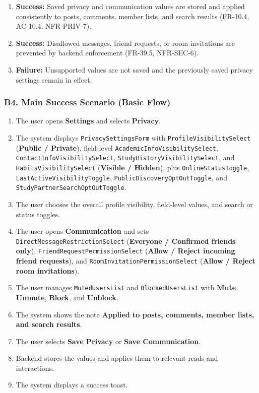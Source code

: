 \documentclass[12pt]{article}
\begin{document}
\begin{enumerate}
\item \textbf{Success:} Saved privacy and communication values are stored and applied consistently to posts, comments, member lists, and search results (FR-10.4, AC-10.4, NFR-PRIV-7).
\item \textbf{Success:} Disallowed messages, friend requests, or room invitations are prevented by backend enforcement (FR-39.5, NFR-SEC-6).
\item \textbf{Failure:} Unsupported values are not saved and the previously saved privacy settings remain in effect.
\end{enumerate}
\par\medskip

\hypertarget{sec:b4-main-success-scenario-basic-flow}{}
\subsubsection*{B4. Main Success Scenario (Basic Flow)}
\par\medskip

\begin{enumerate}
\item The user opens \textbf{Settings} and selects \textbf{Privacy}.
\item The system displays \texttt{PrivacySettingsForm} with \texttt{ProfileVisibilitySelect} (\textbf{Public / Private}), field-level \texttt{AcademicInfoVisibilitySelect}, \texttt{ContactInfoVisibilitySelect}, \texttt{StudyHistoryVisibilitySelect}, and \texttt{HabitsVisibilitySelect} (\textbf{Visible / Hidden}), plus \texttt{OnlineStatusToggle}, \texttt{LastActiveVisibilityToggle}, \texttt{PublicDiscoveryOptOutToggle}, and \texttt{StudyPartnerSearchOptOutToggle}.
\item The user chooses the overall profile visibility, field-level values, and search or status toggles.
\item The user opens \textbf{Communication} and sets \texttt{DirectMessageRestrictionSelect} (\textbf{Everyone / Confirmed friends only}), \texttt{FriendRequestPermissionSelect} (\textbf{Allow / Reject incoming friend requests}), and \texttt{RoomInvitationPermissionSelect} (\textbf{Allow / Reject room invitations}).
\item The user manages \texttt{MutedUsersList} and \texttt{BlockedUsersList} with \textbf{Mute}, \textbf{Unmute}, \textbf{Block}, and \textbf{Unblock}.
\item The system shows the note \textbf{Applied to posts, comments, member lists, and search results}.
\item The user selects \textbf{Save Privacy} or \textbf{Save Communication}.
\item Backend stores the values and applies them to relevant reads and interactions.
\item The system displays a success toast.
\end{enumerate}
\par\medskip
\end{document}
